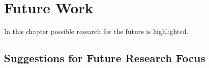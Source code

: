 \chapter{Future Work}


\minitoc

In this chapter possible research for the future is highlighted.
\newpage

\section{Suggestions for Future Research Focus}


\newpage